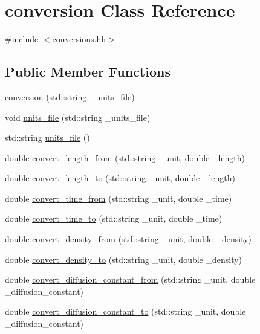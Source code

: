 \hypertarget{classconversion}{}\section{conversion Class Reference}
\label{classconversion}


{\ttfamily \#include $<$conversions.\+hh$>$}

\subsection*{Public Member Functions}
\begin{DoxyCompactItemize}
\item 
\hyperlink{classconversion_a476633c8abd728e0f4ad33dc2637779e}{conversion} (std\+::string \+\_\+units\+\_\+file)
\item 
void \hyperlink{classconversion_a24e7b3c4129aa5d3b5a924a90dd720e5}{units\+\_\+file} (std\+::string \+\_\+units\+\_\+file)
\item 
std\+::string \hyperlink{classconversion_a579716b0280d6b9143c8eecce177c148}{units\+\_\+file} ()
\item 
double \hyperlink{classconversion_afcc6fb9350429dc5a57f6bbdead32270}{convert\+\_\+length\+\_\+from} (std\+::string \+\_\+unit, double \+\_\+length)
\item 
double \hyperlink{classconversion_a305590a90d39aee8c0e94d923d71d090}{convert\+\_\+length\+\_\+to} (std\+::string \+\_\+unit, double \+\_\+length)
\item 
double \hyperlink{classconversion_a77631560733e6f2f168597a0d0b31f1e}{convert\+\_\+time\+\_\+from} (std\+::string \+\_\+unit, double \+\_\+time)
\item 
double \hyperlink{classconversion_a418c40f9ff27aad72c59fd2d890ccd15}{convert\+\_\+time\+\_\+to} (std\+::string \+\_\+unit, double \+\_\+time)
\item 
double \hyperlink{classconversion_a4d015eb0e19703afeecf61f3bb59e8bb}{convert\+\_\+density\+\_\+from} (std\+::string \+\_\+unit, double \+\_\+density)
\item 
double \hyperlink{classconversion_afea60c71cd3cb678e81cb979aef72477}{convert\+\_\+density\+\_\+to} (std\+::string \+\_\+unit, double \+\_\+density)
\item 
double \hyperlink{classconversion_a11fab44bd149eeda60906aa2a3015712}{convert\+\_\+diffusion\+\_\+constant\+\_\+from} (std\+::string \+\_\+unit, double \+\_\+diffusion\+\_\+constant)
\item 
double \hyperlink{classconversion_aa940aa3ae2480422f6056c46dc0e8cc1}{convert\+\_\+diffusion\+\_\+constant\+\_\+to} (std\+::string \+\_\+unit, double \+\_\+diffusion\+\_\+constant)

\end{DoxyCompactItemize}
